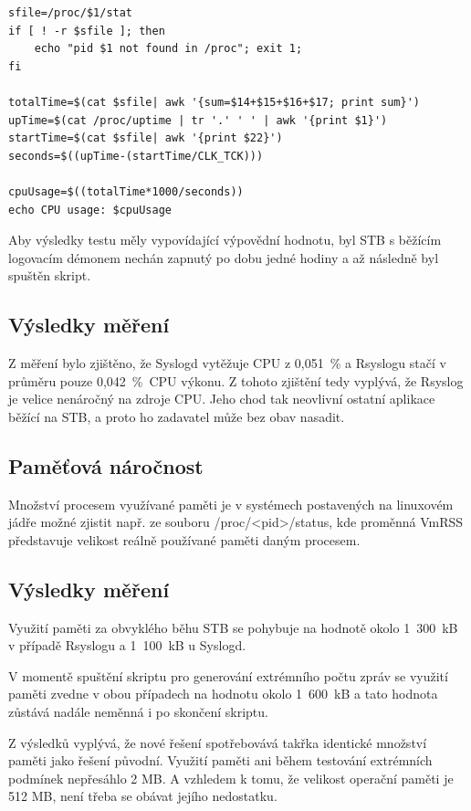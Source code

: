 \documentclass[thesis=B,czech]{FITthesis}[2012/06/26]
\begin{document}
\begin{lstlisting}[style=AshStyle]
sfile=/proc/$1/stat
if [ ! -r $sfile ]; then
    echo "pid $1 not found in /proc"; exit 1;
fi

totalTime=$(cat $sfile| awk '{sum=$14+$15+$16+$17; print sum}')
upTime=$(cat /proc/uptime | tr '.' ' ' | awk '{print $1}')
startTime=$(cat $sfile| awk '{print $22}')
seconds=$((upTime-(startTime/CLK_TCK)))

cpuUsage=$((totalTime*1000/seconds))
echo CPU usage: $cpuUsage
\end{lstlisting}
Aby výsledky testu měly vypovídající výpovědní hodnotu, byl STB s běžícím logovacím démonem nechán zapnutý po dobu jedné hodiny a až následně byl spuštěn skript.

\subsection*{Výsledky měření}
Z měření bylo zjištěno, že Syslogd vytěžuje CPU z 0,051~\% a Rsyslogu stačí v průměru pouze 0,042~\%~CPU výkonu. Z tohoto zjištění tedy vyplývá, že Rsyslog je velice nenáročný na zdroje CPU. Jeho chod tak neovlivní ostatní aplikace běžící na STB, a proto ho zadavatel může bez obav nasadit.

\subsection{Paměťová náročnost}
Množství procesem využívané paměti je v systémech postavených na linuxovém jádře možné zjistit např. ze souboru /proc/<pid>/status, kde proměnná VmRSS představuje velikost reálně používané paměti daným procesem.

\subsection*{Výsledky měření}
Využití paměti za obvyklého běhu STB se pohybuje na hodnotě okolo 1~300~kB v případě Rsyslogu a 1~100~kB u Syslogd.

V momentě spuštění skriptu pro generování extrémního počtu zpráv se využití paměti zvedne v obou případech na hodnotu okolo 1~600~kB a tato hodnota zůstává nadále neměnná i po skončení skriptu.

Z výsledků vyplývá, že nové řešení spotřebovává takřka identické množství paměti jako řešení původní. Využití paměti ani během testování extrémních podmínek nepřesáhlo 2 MB. A vzhledem k tomu, že velikost operační paměti je 512 MB, není třeba se obávat jejího nedostatku.
\end{document}
